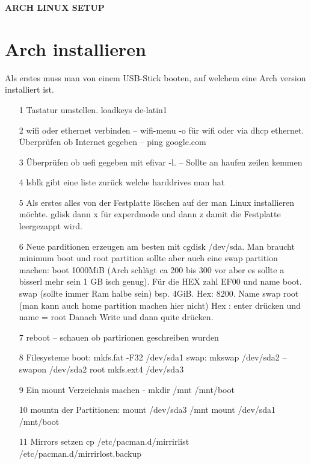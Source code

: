 \documentclass[a4paper,12pt]{article}
\begin{document}
\begin{titlepage}
\begin{LARGE}
	\begin{center}
		\textbf{ARCH LINUX SETUP}
	\end{center}
\end{LARGE}
\end{titlepage}
\section{Arch installieren}
Als erstes muss man von einem USB-Stick booten, auf welchem eine Arch version installiert ist.
\begin{itemize}
	\item[1] Tastatur umstellen. loadkeys de-latin1	
	\item[2] wifi oder ethernet verbinden -- wifi-menu -o für wifi oder via dhcp ethernet. Überprüfen ob Internet gegeben -- ping google.com
	\item[3] Überprüfen ob uefi gegeben mit efivar -l. -- Sollte an haufen zeilen kemmen
	\item[4] lsblk gibt eine liste zurück welche harddrives man hat
	\item[5] Als erstes alles von der Festplatte löschen auf der man Linux installieren möchte. gdisk dann x für experdmode und dann z damit die Festplatte leergezappt wird.
	\item[6] Neue parditionen erzeugen am besten mit cgdisk /dev/sda. Man braucht minimum boot und root partition sollte aber auch eine swap partition machen:
	\subitem boot 1000MiB (Arch schlägt ca 200 bis 300 vor aber es sollte a bisserl mehr sein 1 GB isch genug). Für die HEX zahl EF00 und name boot. 
	\subitem swap (sollte immer Ram halbe sein) bsp. 4GiB. Hex: 8200. Name swap
	\subitem root (man kann auch home partition machen hier nicht) Hex : enter drücken und name = root
	Danach Write und dann quite drücken.
	\item[7] reboot -- schauen ob partirionen geschreiben wurden
	\item[8] Filesysteme
	\subitem boot: mkfs.fat -F32 /dev/sda1
	\subitem swap: mkswap /dev/sda2 -- swapon /dev/sda2
	\subitem root mkfs.ext4 /dev/sda3
	\item[9] Ein mount Verzeichnis machen - mkdir /mnt /mnt/boot 
	\item[10] mountn der Partitionen:
	\subitem mount /dev/sda3 /mnt
	\subitem mount /dev/sda1 /mnt/boot
	\item[11] Mirrors setzen 
	\subitem cp /etc/pacman.d/mirrirlist /etc/pacman.d/mirrirlost.backup 

\end{itemize}
\end{document}
